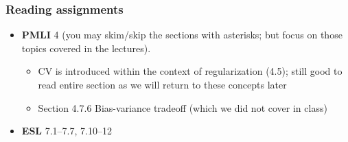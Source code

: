 \documentclass[smaller]{beamer}
\newcommand{\?}{\stackrel{?}{=}}
\newcommand{\fr}{\frac}
\newcommand{\gr}{\color{green!40!black}}
\begin{document}
\begin{frame}
  \frametitle{Reading assignments}

  \begin{itemize}
  \item \textbf{PMLI} 4 (you may skim/skip the sections with asterisks; but focus on those topics covered in the lectures).
    \begin{itemize}
      \item CV is introduced within the context of regularization (4.5); still good to read entire section as we will return to these concepts later
    \item Section 4.7.6 Bias-variance tradeoff (which we did not cover in class)
    \end{itemize}
  \item \textbf{ESL} 7.1--7.7, 7.10--12

  \end{itemize}
\end{frame}





\appendix\addtocounter{part}{-1}



  

  
\end{document}
